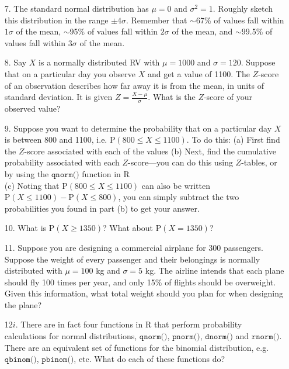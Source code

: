 \documentclass[10pt]{extarticle}
\renewcommand{\P}{\text{P}}
\begin{document}
\begin{itemize}

	\item[7.] The standard normal distribution has $\mu = 0$ and $\sigma^2 = 1$. Roughly sketch this distribution in the range $\pm 4\sigma$. Remember that $\sim$67\% of values fall within $1\sigma$ of the mean, $\sim$95\% of values fall within $2\sigma$ of the mean, and $\sim$99.5\% of values fall within $3\sigma$ of the mean. \\ 

	\item[8.] Say $X$ is a normally distributed RV with $\mu = 1000$ and $\sigma = 120$. Suppose that on a particular day you observe $X$ and get a value of 1100. The $Z$-score of an observation describes how far away it is from the mean, in units of standard deviation. It is given $Z = \frac{X - \mu}{\sigma}$. What is the $Z$-score of your observed value? \\  

	\item[9.] Suppose you want to determine the probability that on a particular day $X$ is between 800 and 1100, i.e. $\P(800 \leq X \leq 1100)$. To do this: (a) First find the $Z$-score associated with each of the values (b) Next, find the cumulative probability associated with each $Z$-score---you can do this using $Z$-tables, or by using the $\texttt{qnorm()}$ function in R \\ 
(c) Noting that $\P(800 \leq X \leq 1100)$ can also be written $\P(X \leq 1100) - \P(X \leq 800)$, you can simply subtract the two probabilities you found in part (b) to get your answer. \\  

	\item[10.] What is $\P(X \geq 1350)$? What about $\P(X = 1350)$? \\ 

	\item[11.] Suppose you are designing a commercial airplane for 300 passengers. Suppose the weight of every passenger and their belongings is normally distributed with $\mu = 100$ kg and $\sigma = 5$ kg. The airline intends that each plane should fly 100 times per year, and only 15\% of flights should be overweight. Given this information, what total weight should you plan for when designing the plane? \\  

	\item[12$i$.] There are in fact four functions in R that perform probability calculations for normal distributions, $\texttt{qnorm()}$, $\texttt{pnorm()}$, $\texttt{dnorm()}$ and $\texttt{rnorm()}$. There are an equivalent set of functions for the binomial distribution, e.g. $\texttt{qbinom()}$, $\texttt{pbinom()}$, etc. What do each of these functions do? 

\end{itemize}
\end{document}
